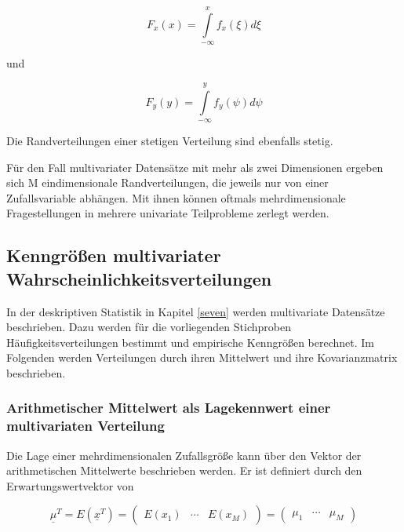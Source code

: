 \begin{equation}\label{eq:eighttwentythree}
F_{x} (x)=\int\limits _{-\infty}^{x}f_{x} (\xi) d\xi
\end{equation}

\noindent und

\begin{equation}\label{eq:eighttwentyfour}
F_{y} (y)=\int\limits _{-\infty }^{y}f_{y} (\psi) d\psi
\end{equation}

\noindent Die Randverteilungen einer stetigen Verteilung sind ebenfalls stetig.\newline

\noindent F\"{u}r den Fall multivariater Datens\"{a}tze mit mehr als zwei Dimensionen ergeben sich M eindimensionale Randverteilungen, die jeweils nur von einer Zufallsvariable abh\"{a}ngen. Mit ihnen k\"{o}nnen oftmals mehrdimensionale Fragestellungen in mehrere univariate Teilprobleme zerlegt werden.

\clearpage

\subsection{Kenngr\"{o}{\ss}en multivariater Wahrscheinlichkeitsverteilungen}

\noindent In der deskriptiven Statistik in Kapitel \ref{seven} werden multivariate Datens\"{a}tze beschrieben. Dazu werden f\"{u}r die vorliegenden Stichproben H\"{a}ufigkeitsverteilungen bestimmt und empirische Kenngr\"{o}{\ss}en berechnet. Im Folgenden werden Verteilungen durch ihren Mittelwert und ihre Kovarianzmatrix beschrieben.

\subsubsection{Arithmetischer Mittelwert als Lagekennwert einer multivariaten Verteilung}

\noindent Die Lage einer mehrdimensionalen Zufallsgr\"{o}{\ss}e  kann \"{u}ber den Vektor der arithmetischen Mittelwerte beschrieben werden. Er ist definiert durch den Erwartungswertvektor von 

\begin{equation}\label{eq:eighttwentyfive}
\underline{\mu }^{T} =E\left(\underline{x}^{T} \right)=\left(\begin{array}{ccc} {E(x_{1})} & {\cdots } & {E(x_{M})} \end{array}\right)=\left(\begin{array}{ccc} {\mu _{1} } & {\cdots } & {\mu _{M}} \end{array}\right)
\end{equation}

